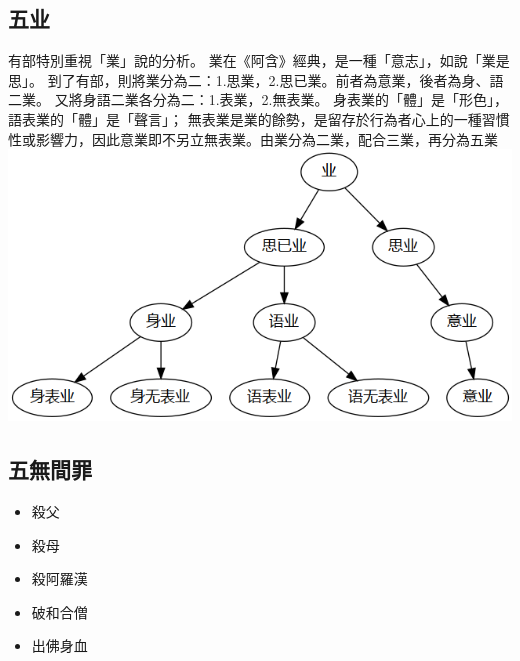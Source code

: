 \subsection{五业}
有部特別重視「業」說的分析。
業在《阿含》經典，是一種「意志」，如說「業是思」。
到了有部，則將業分為二：1.思業，2.思已業。前者為意業，後者為身、語二業。
又將身語二業各分為二：1.表業，2.無表業。
身表業的「體」是「形色」，語表業的「體」是「聲言」；
無表業是業的餘勢，是留存於行為者心上的一種習慣性或影響力，因此意業即不另立無表業。由業分為二業，配合三業，再分為五業
\includegraphics[scale=0.5]{释家/images/五业.png}

\subsection{五無間罪}
\begin{itemize}
  \item 殺父
  \item 殺母
  \item 殺阿羅漢
  \item 破和合僧
  \item 出佛身血
\end{itemize}
